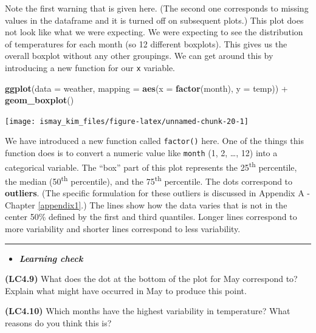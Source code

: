 \documentclass[]{tufte-book}
\newenvironment{Shaded}{\begin{snugshade}}{\end{snugshade}}
\newcommand{\KeywordTok}[1]{\textcolor[rgb]{0.13,0.29,0.53}{\textbf{{#1}}}}
\newcommand{\DataTypeTok}[1]{\textcolor[rgb]{0.13,0.29,0.53}{{#1}}}
\newcommand{\StringTok}[1]{\textcolor[rgb]{0.31,0.60,0.02}{{#1}}}
\newcommand{\NormalTok}[1]{{#1}}
\newenvironment{rmdblock}[1]
  {\begin{shaded*}
  \begin{itemize}
  \renewcommand{\labelitemi}{
    \raisebox{-.7\height}[0pt][0pt]{
    }
  }
  \item
  }
  {
  \end{itemize}
  \end{shaded*}
  }
\newenvironment{learncheck}
  {\begin{rmdblock}{warning}}
  {\end{rmdblock}}
\begin{document}
Note the first warning that is given here. (The second one corresponds
to missing values in the dataframe and it is turned off on subsequent
plots.) This plot does not look like what we were expecting. We were
expecting to see the distribution of temperatures for each month (so 12
different boxplots). This gives us the overall boxplot without any other
groupings. We can get around this by introducing a new function for our
\texttt{x} variable.

\begin{Shaded}
\begin{Highlighting}[]
\KeywordTok{ggplot}\NormalTok{(}\DataTypeTok{data =} \NormalTok{weather, }\DataTypeTok{mapping =} \KeywordTok{aes}\NormalTok{(}\DataTypeTok{x =} \KeywordTok{factor}\NormalTok{(month), }\DataTypeTok{y =} \NormalTok{temp)) +}
\StringTok{  }\KeywordTok{geom_boxplot}\NormalTok{()}
\end{Highlighting}
\end{Shaded}

\texttt{[image: ismay\_kim\_files/figure-latex/unnamed-chunk-20-1]}

We have introduced a new function called \texttt{factor()} here. One of
the things this function does is to convert a numeric value like
\texttt{month} (1, 2, \ldots{}, 12) into a categorical variable. The
``box'' part of this plot represents the 25\textsuperscript{th}
percentile, the median (50\textsuperscript{th} percentile), and the
75\textsuperscript{th} percentile. The dots correspond to
\textbf{outliers}. (The specific formulation for these outliers is
discussed in Appendix A - Chapter \ref{appendix1}.) The lines show how
the data varies that is not in the center 50\% defined by the first and
third quantiles. Longer lines correspond to more variability and shorter
lines correspond to less variability.

\begin{center}\rule{0.5\linewidth}{\linethickness}\end{center}

\begin{learncheck}
\textbf{\emph{Learning check}}
\end{learncheck}

\textbf{(LC4.9)} What does the dot at the bottom of the plot for May
correspond to? Explain what might have occurred in May to produce this
point.

\textbf{(LC4.10)} Which months have the highest variability in
temperature? What reasons do you think this is?
\end{document}
